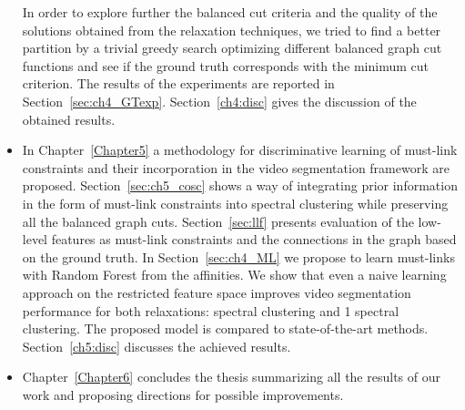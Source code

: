 \begin{itemize}
In order to explore further the balanced cut criteria and the quality of the solutions obtained from the relaxation techniques, we tried to find a better partition by a trivial greedy search optimizing different balanced graph cut functions and see if the ground truth corresponds
with the minimum cut criterion. The results of the experiments are reported in Section~\ref{sec:ch4_GTexp}.
Section~\ref{ch4:disc} gives the discussion of the obtained results.
\item In Chapter~\ref{Chapter5} a methodology for discriminative learning of must-link constraints and their incorporation in the video segmentation framework are proposed.
Section~\ref{sec:ch5_cosc} shows a way of integrating prior information in the form of must-link constraints into spectral clustering while preserving all the
balanced graph cuts.
Section~\ref{sec:llf} presents evaluation of the low-level features as must-link constraints and the connections in the graph based on the ground truth.
In Section~\ref{sec:ch4_ML} we propose to learn must-links with Random Forest from the affinities.
We show that even a naive learning approach on the restricted feature space improves video segmentation performance for both relaxations: spectral clustering and 1 spectral clustering. 
The proposed model is compared to state-of-the-art methods.
Section~\ref{ch5:disc} discusses the achieved results.
\item Chapter~\ref{Chapter6} concludes the thesis summarizing all the results of our work and proposing directions for possible improvements.
\end{itemize}
